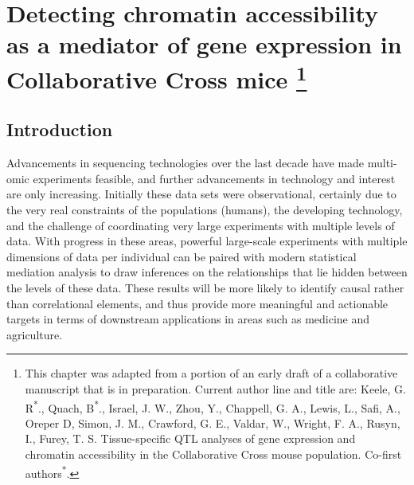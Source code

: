 \chapter[Detecting chromatin accessibility as a mediator of gene expression in Collaborative Cross mice]{Detecting chromatin accessibility as a mediator of gene expression in Collaborative Cross mice
\footnote{This chapter was adapted from a portion of an early draft of a collaborative manuscript that is in preparation. Current author line and title are: Keele, G. R\textsuperscript{*}., Quach, B\textsuperscript{*}., Israel, J. W., Zhou, Y., Chappell, G. A., Lewis, L., Safi, A., Oreper D, Simon, J. M., Crawford, G. E., Valdar, W., Wright, F. A., Rusyn, I., Furey, T. S. Tissue-specific QTL analyses of gene expression and chromatin accessibility in the Collaborative Cross mouse population. Co-first authors\textsuperscript{*}.}}
\label{chap:mediation}

\section{Introduction}

Advancements in sequencing technologies over the last decade have made multi-omic experiments feasible, and further advancements in technology and interest are only increasing. Initially these data sets were observational, certainly due to the very real constraints of the populations (humans), the developing technology, and the challenge of coordinating very large experiments with multiple levels of data. With progress in these areas, powerful large-scale experiments with multiple dimensions of data per individual can be paired with modern statistical mediation analysis to draw inferences on the relationships that lie hidden between the levels of these data. These results will be more likely to identify causal rather than correlational elements, and thus provide more meaningful and actionable targets in terms of downstream applications in areas such as medicine and agriculture.

